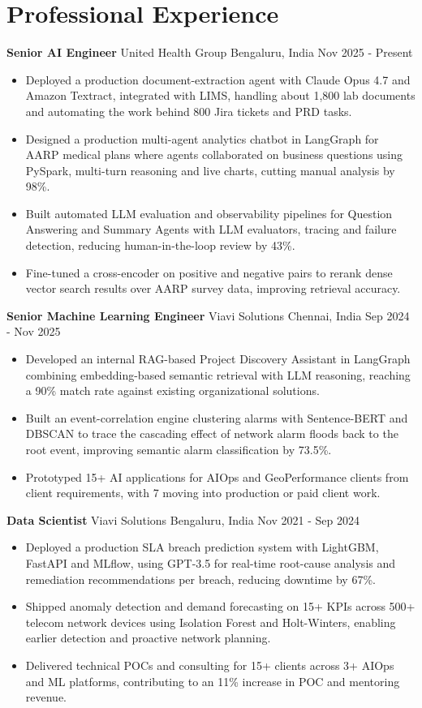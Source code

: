 \documentclass[10pt,a4paper]{article}
\newcommand{\role}[4]{\textbf{#1} \textbar{} #2 \hfill #3 \textbar{} #4\par}
\begin{document}
\section{Professional Experience}
\role{Senior AI Engineer}{United Health Group}{Bengaluru, India}{Nov 2025 - Present}
\begin{itemize}
  \item Deployed a production document-extraction agent with Claude Opus 4.7 and Amazon Textract, integrated with LIMS, handling about 1,800 lab documents and automating the work behind 800 Jira tickets and PRD tasks.
  \item Designed a production multi-agent analytics chatbot in LangGraph for AARP medical plans where agents collaborated on business questions using PySpark, multi-turn reasoning and live charts, cutting manual analysis by 98\%.
  \item Built automated LLM evaluation and observability pipelines for Question Answering and Summary Agents with LLM evaluators, tracing and failure detection, reducing human-in-the-loop review by 43\%.
  \item Fine-tuned a cross-encoder on positive and negative pairs to rerank dense vector search results over AARP survey data, improving retrieval accuracy.
\end{itemize}
\vspace{3pt}
\role{Senior Machine Learning Engineer}{Viavi Solutions}{Chennai, India}{Sep 2024 - Nov 2025}
\begin{itemize}
  \item Developed an internal RAG-based Project Discovery Assistant in LangGraph combining embedding-based semantic retrieval with LLM reasoning, reaching a 90\% match rate against existing organizational solutions.
  \item Built an event-correlation engine clustering alarms with Sentence-BERT and DBSCAN to trace the cascading effect of network alarm floods back to the root event, improving semantic alarm classification by 73.5\%.
  \item Prototyped 15+ AI applications for AIOps and GeoPerformance clients from client requirements, with 7 moving into production or paid client work.
\end{itemize}
\vspace{3pt}
\role{Data Scientist}{Viavi Solutions}{Bengaluru, India}{Nov 2021 - Sep 2024}
\begin{itemize}
  \item Deployed a production SLA breach prediction system with LightGBM, FastAPI and MLflow, using GPT-3.5 for real-time root-cause analysis and remediation recommendations per breach, reducing downtime by 67\%.
  \item Shipped anomaly detection and demand forecasting on 15+ KPIs across 500+ telecom network devices using Isolation Forest and Holt-Winters, enabling earlier detection and proactive network planning.
  \item Delivered technical POCs and consulting for 15+ clients across 3+ AIOps and ML platforms, contributing to an 11\% increase in POC and mentoring revenue.
\end{itemize}
\end{document}
